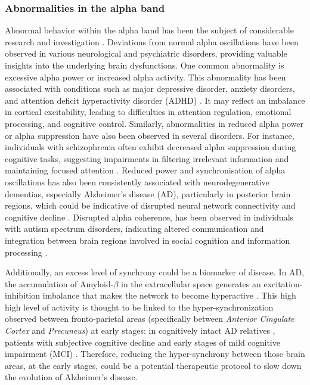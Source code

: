 \documentclass[../main.tex]{subfiles}
\begin{document}
\subsubsection{Abnormalities in the alpha band}
Abnormal behavior within the alpha band has been the subject of considerable research and investigation \citep{arns_effects_2012,locatelli_eeg_1998,adler_eeg_2003,jeong_eeg_2004,uhlhaas_neural_2006,stroganova1999eeg}.
Deviations from normal alpha oscillations have been observed in various neurological and psychiatric disorders, providing valuable insights into the underlying brain dysfunctions.
One common abnormality is excessive alpha power or increased alpha activity.
This abnormality has been associated with conditions such as major depressive disorder, anxiety disorders, and attention deficit hyperactivity disorder (ADHD) \citep{arns_effects_2012}.
It may reflect an imbalance in cortical excitability, leading to difficulties in attention regulation, emotional processing, and cognitive control.
Similarly, abnormalities in reduced alpha power or alpha suppression have also been observed in several disorders.
For instance, individuals with schizophrenia often exhibit decreased alpha suppression during cognitive tasks, suggesting impairments in filtering irrelevant information and maintaining focused attention \citep{arns_effects_2012}.
Reduced power and synchronisation of alpha oscillations has also been consistently associated with neurodegenerative dementias, especially Alzheimer's disease (AD), particularly in posterior brain regions, which could be indicative of disrupted neural network connectivity and cognitive decline \citep{locatelli_eeg_1998,adler_eeg_2003,jeong_eeg_2004,uhlhaas_neural_2006}.
Disrupted alpha coherence, has been observed in individuals with autism spectrum disorders, indicating altered communication and integration between brain regions involved in social cognition and information processing \citep{stroganova1999eeg}.

Additionally, an excess level of synchrony could be a biomarker of disease. 
In AD, the accumulation of Amyloid-$\beta$ in the extracellular space generates an excitation-inhibition imbalance that makes the network to become hyperactive \citep{kazim2021neuronal}.
This high high level of activity is thought to be linked to the hyper-synchronization observed between fronto-parietal areas (specifically between \textit{Anterior Cingulate Cortex} and \textit{Precuneus}) at early stages: in cognitively intact AD relatives \citep{ramirez2021functional}, patients with subjective cognitive decline \citep{hafkemeijer2013increased, lopez2017functional} and early stages of mild cognitive impairment (MCI) \citep{lopez_alpha-band_2014}.
Therefore, reducing the hyper-synchrony between those brain areas, at the early stages, could be a potential therapeutic protocol to slow down the evolution of Alzheimer's disease.
\clearpage
\end{document}
